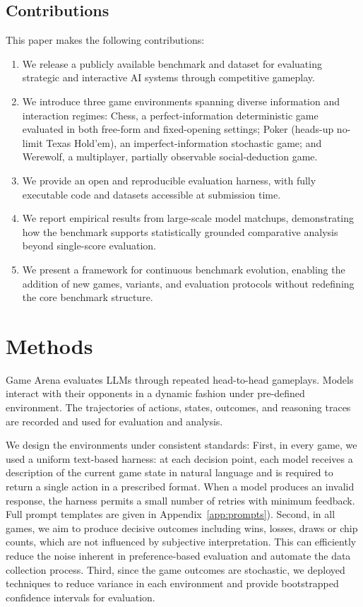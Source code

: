 \documentclass{article}
\begin{document}
\subsection{Contributions}
This paper makes the following contributions:
\begin{enumerate}
    \item We release a publicly available benchmark and dataset for evaluating strategic and interactive AI systems through competitive gameplay.
    \item We introduce three game environments spanning diverse information and interaction regimes: Chess, a perfect-information deterministic game evaluated in both free-form and fixed-opening settings; Poker (heads-up no-limit Texas Hold'em), an imperfect-information stochastic game; and Werewolf, a multiplayer, partially observable social-deduction game.
    \item We provide an open and reproducible evaluation harness, with fully executable code and datasets accessible at submission time.
    \item We report empirical results from large-scale model matchups, demonstrating how the benchmark supports statistically grounded comparative analysis beyond single-score evaluation.
    \item We present a framework for continuous benchmark evolution, enabling the addition of new games, variants, and evaluation protocols without redefining the core benchmark structure.
\end{enumerate}

\section{Methods}
\label{sec:methods}

Game Arena evaluates LLMs through repeated head-to-head gameplays. Models interact with their opponents in a dynamic fashion under pre-defined environment. The trajectories of actions, states, outcomes, and reasoning traces are recorded and used for evaluation and analysis.

We design the environments under consistent standards: First, in every game, we used a uniform text-based harness: at each decision point, each model receives a description of the current game state in natural language and is required to return a single action in a prescribed format. When a model produces an invalid response, the harness permits a small number of retries with minimum feedback. Full prompt templates are given in Appendix~\ref{app:prompts}). Second, in all games, we aim to produce decisive outcomes including wins, losses, draws or chip counts, which are not influenced by subjective interpretation. This can efficiently reduce the noise inherent in preference-based evaluation and automate the data collection process. Third, since the game outcomes are stochastic, we deployed techniques to reduce variance in each environment and provide bootstrapped confidence intervals for evaluation.
\end{document}
